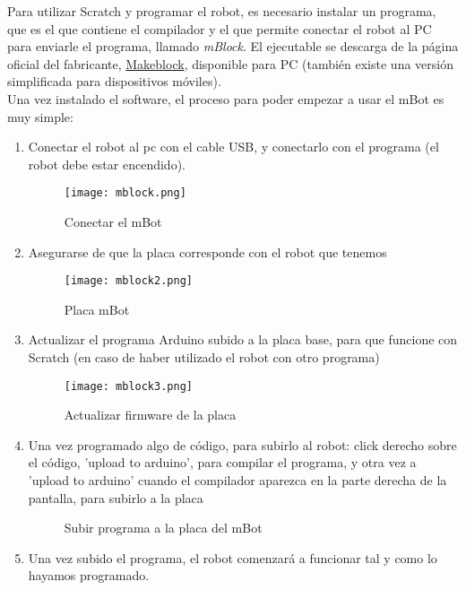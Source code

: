 Para utilizar Scratch y programar el robot, es necesario instalar un programa, que es el que contiene el compilador y el que permite conectar el robot al PC para enviarle el programa, llamado \textit{mBlock}. El ejecutable se descarga de la página oficial del fabricante, \href{https://www.makeblock.es/blog/descargas/}{Makeblock}, disponible para PC (también existe una versión simplificada para dispositivos móviles).\\
Una vez instalado el software, el proceso para poder empezar a usar el mBot es muy simple:
\begin{enumerate}
	\item Conectar el robot al pc con el cable USB, y conectarlo con el programa (el robot debe estar encendido).
	\begin{figure}[H]
		\texttt{[image: mblock.png]}
		\centering
		\label{img:mblock}
		\caption{Conectar el mBot}
	\end{figure}

	\item  Asegurarse de que la placa corresponde con el robot que tenemos
	\begin{figure}[H]
		\texttt{[image: mblock2.png]}
		\centering
		\label{img:mblock2}
		\caption{Placa mBot}
	\end{figure}

	\item Actualizar el programa Arduino subido a la placa base, para que funcione con Scratch (en caso de haber utilizado el robot con otro programa)
	\begin{figure}[H]
		\texttt{[image: mblock3.png]}
		\centering
		\label{img:mblock3}
		\caption{Actualizar firmware de la placa}
	\end{figure}

	\item Una vez programado algo de código, para subirlo al robot: click derecho sobre el código, 'upload to arduino', para compilar el programa, y otra vez a 'upload to arduino' cuando el compilador aparezca en la parte derecha de la pantalla, para subirlo a la placa
	\begin{figure}[H]
		\centering
		\begin{subfigure}
			[Compilar programa]{
				\texttt{[image: mblock4.png]}
				\label{img:uploadArduino1}}
		\end{subfigure}
		\begin{subfigure}
			[Subir programa a la placa]{
				\texttt{[image: mblock5.png]}
				\label{img:uploadArduino2}}
		\end{subfigure}
	\label{img:uploadArduino}
	\caption{Subir programa a la placa del mBot}
	\end{figure}

	\item Una vez subido el programa, el robot comenzará a funcionar tal y como lo hayamos programado.
\end{enumerate}
 


